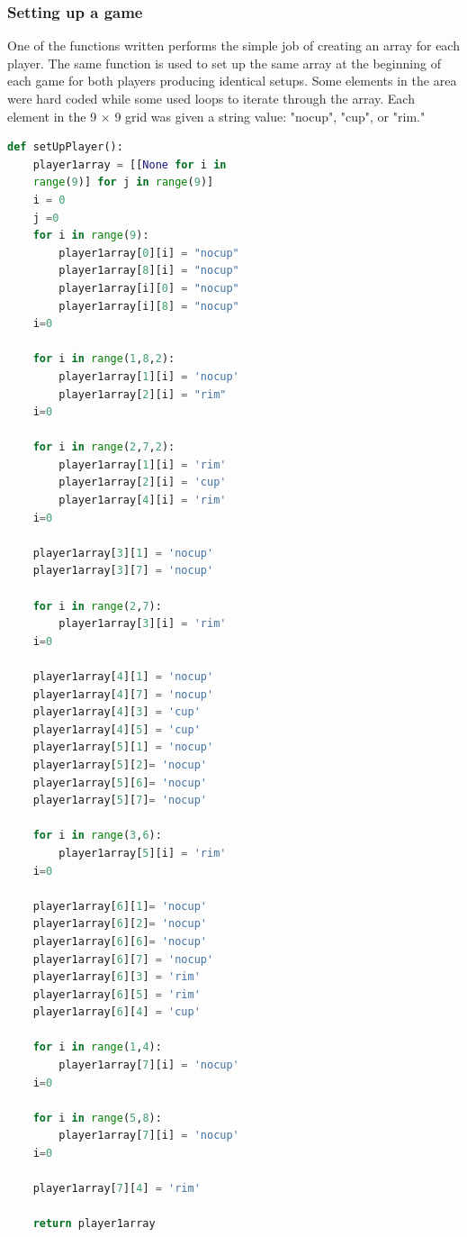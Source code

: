 \documentclass{article}
\begin{document}
\subsubsection{Setting up a game}
One of the functions written performs the simple job of creating an array for each player. The same function is used to set up the same array at the beginning of each game for both players producing identical setups. Some elements in the area were hard coded while some used loops to iterate through the array. Each element in the 9 $\times$ 9 grid was given a string value: "nocup", "cup", or "rim."
\begin{lstlisting}[language=Python]
def setUpPlayer():
    player1array = [[None for i in 
    range(9)] for j in range(9)]
    i = 0
    j =0
    for i in range(9):
        player1array[0][i] = "nocup"
        player1array[8][i] = "nocup"
        player1array[i][0] = "nocup"
        player1array[i][8] = "nocup"
    i=0

    for i in range(1,8,2):
        player1array[1][i] = 'nocup'
        player1array[2][i] = "rim"
    i=0

    for i in range(2,7,2):
    	player1array[1][i] = 'rim'
    	player1array[2][i] = 'cup'
    	player1array[4][i] = 'rim'
    i=0
    
    player1array[3][1] = 'nocup'
    player1array[3][7] = 'nocup'
    
    for i in range(2,7):
    	player1array[3][i] = 'rim'
    i=0
    
    player1array[4][1] = 'nocup'
    player1array[4][7] = 'nocup'
    player1array[4][3] = 'cup'
    player1array[4][5] = 'cup'
    player1array[5][1] = 'nocup'
    player1array[5][2]= 'nocup'
    player1array[5][6]= 'nocup'
    player1array[5][7]= 'nocup'
    
    for i in range(3,6):
    	player1array[5][i] = 'rim'
    i=0
    
    player1array[6][1]= 'nocup'
    player1array[6][2]= 'nocup'
    player1array[6][6]= 'nocup'
    player1array[6][7] = 'nocup'
    player1array[6][3] = 'rim'
    player1array[6][5] = 'rim'
    player1array[6][4] = 'cup'
    
    for i in range(1,4):
    	player1array[7][i] = 'nocup'
    i=0
    
    for i in range(5,8):
    	player1array[7][i] = 'nocup'
    i=0
    
    player1array[7][4] = 'rim'
    
    return player1array
\end{lstlisting}
\end{document}
